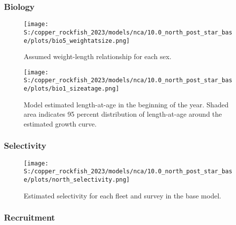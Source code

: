 \documentclass[11pt,
  letterpaper,
]{article}
\begin{document}
\pagebreak

\pagebreak

\subsubsection{Biology}\label{biology-1}

\begin{figure}
{\centering
\texttt{[image: S:/copper\_rockfish\_2023/models/nca/10.0\_north\_post\_star\_base/plots/bio5\_weightatsize.png]}
}
\caption{Assumed weight-length relationship for each sex.\label{fig:est-len-wght}}
\end{figure}

\pagebreak

\begin{figure}
{\centering
\texttt{[image: S:/copper\_rockfish\_2023/models/nca/10.0\_north\_post\_star\_base/plots/bio1\_sizeatage.png]}
}
\caption{Model estimated length-at-age in the beginning of the year. Shaded area indicates 95 percent distribution of length-at-age around the estimated growth curve.\label{fig:mod-est-len-age}}
\end{figure}

\pagebreak

\subsubsection{Selectivity}\label{selectivity}

\begin{figure}
{\centering
\texttt{[image: S:/copper\_rockfish\_2023/models/nca/10.0\_north\_post\_star\_base/plots/north\_selectivity.png]}
}
\caption{Estimated selectivity for each fleet and survey in the base model.\label{fig:est-selex}}
\end{figure}

\pagebreak

\subsubsection{Recruitment}\label{recruitment-1}
\end{document}
